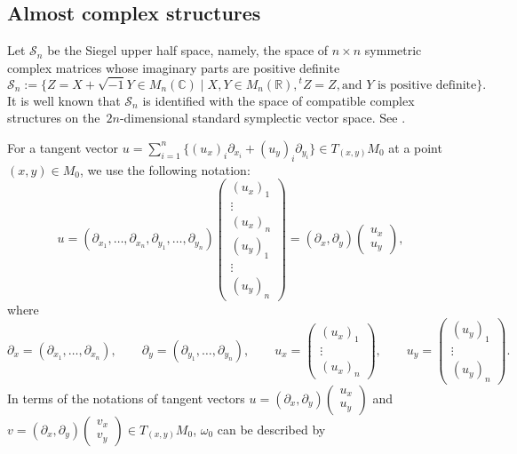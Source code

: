 \documentclass[10pt,a4paper]{amsart}
\numberwithin{equation}{section}
\newcommand{\C}{\mathbb{C}}
\newcommand{\R}{\mathbb{R}}
\begin{document}
\subsection{Almost complex structures}
Let ${\mathcal S}_n$ be the Siegel upper half space, namely, the space of $n\times n$ symmetric complex matrices whose imaginary parts are positive definite
\[
{\mathcal S}_n:=\big\{ Z=X+\sqrt{-1}Y\in M_n(\C)\mid X, Y\in M_n(\R), {}^tZ=Z, \text{and }Y\text{ is positive definite} \big\} .
\]
It is well known that ${\mathcal S}_n$ is identified with the space of compatible complex structures on the~$2n$-dimensional standard symplectic vector space. See \cite[Chapter II, Section~4]{Mumford1}.

For a tangent vector $u=\sum_{i=1}^n \{(u_x)_i\partial_{x_i}+(u_y)_i\partial_{y_i} \}\in T_{(x,y)}M_0$ at a point $(x,y)\in M_0$, we use the following notation:
\[
u
= (\partial_{x_1},\ldots, \partial_{x_n}, \partial_{y_1},\ldots, \partial_{y_n} )
\begin{pmatrix}
(u_x)_1 \\
\vdots \\
(u_x)_n \\
(u_y)_1\\
\vdots \\
(u_y)_n
\end{pmatrix}
=(\partial_x, \partial_y)
\begin{pmatrix}
u_x \\
u_y
\end{pmatrix},
\]
where
\[
\partial_x=(\partial_{x_1},\ldots, \partial_{x_n}),\qquad \partial_y=(\partial_{y_1},\ldots, \partial_{y_n}),\qquad
u_x=
\begin{pmatrix}
(u_x)_1\\
\vdots \\
(u_x)_n
\end{pmatrix},\qquad
u_y=
\begin{pmatrix}
(u_y)_1\\
\vdots\\
(u_y)_n
\end{pmatrix}.
\]
In terms of the notations of tangent vectors
$u=(\partial_x, \partial_y)
\left(\begin{smallmatrix}
u_x \\
u_y
\end{smallmatrix}\right)$
and
$v=(\partial_x, \partial_y)
\left(\begin{smallmatrix}
v_x \\
v_y
\end{smallmatrix}\right)\in T_{(x,y)}M_0$, $\omega_0$ can be described by
\end{document}

